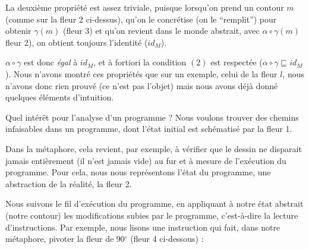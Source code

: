 \documentclass[french]{article}
\begin{document}
  \medbreak

  La deuxième propriété est assez triviale, puisque lorsqu'on prend un contour $m$ (comme sur la fleur 2 ci-dessus), qu'on le concrétise (on le ``remplit'') pour obtenir $\gamma (m)$ (fleur 3) et qu'on revient dans le monde abstrait, avec $\alpha \circ \gamma (m)$ fleur 2), on obtient toujours l'identité ($id_M$).

  $\alpha \circ \gamma$ est donc \textit{égal} à $id_M$, et à fortiori la condition $(2)$ est respectée ($\alpha \circ \gamma \sqsubseteq id_M$). Nous n'avons montré ces propriétés que sur un exemple, celui de la fleur $l$, nous n'avons donc rien prouvé (ce n'est pas l'objet) mais nous avons déjà donné quelques éléments d'intuition.

  \bigbreak

  Quel intérêt pour l'analyse d'un programme ? Nous voulons trouver des chemins infaisables dans un programme, dont l'état initial est schématisé par la fleur 1.

  Dans la métaphore, cela revient, par exemple, à vérifier que le dessin ne disparait jamais entièrement (il n'est jamais vide) au fur et à mesure de l'exécution du programme. Pour cela, nous nous représentons l'état du programme, une abstraction de la réalité, la fleur 2.

  Nous suivons le fil d'exécution du programme, en appliquant à notre état abstrait (notre contour) les modifications subies par le programme, c'est-à-dire la lecture d'instructions. Par exemple, nous lisons une instruction qui fait, dans notre métaphore, pivoter la fleur de 90$^{\circ}$ (fleur 4 ci-dessous) :
\end{document}
